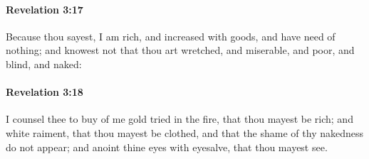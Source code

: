 		\paragraph{Revelation 3:17} %
			\label{REVELATIONNT-3-17}

			Because thou sayest, I am rich, and increased with goods, and have need of nothing; and knowest not that thou art wretched, and miserable, and poor, and blind, and naked:

			\begin{framed}
			\scriptsize
				\begin{compactdesc}
					\item[SBLG] 
				\end{compactdesc}
			\end{framed}

		\paragraph{Revelation 3:18} %
			\label{REVELATIONNT-3-18}

			I counsel thee to buy of me gold tried in the fire, that thou mayest be rich; and white raiment, that thou mayest be clothed, and that the shame of thy nakedness do not appear; and anoint thine eyes with eyesalve, that thou mayest see.

